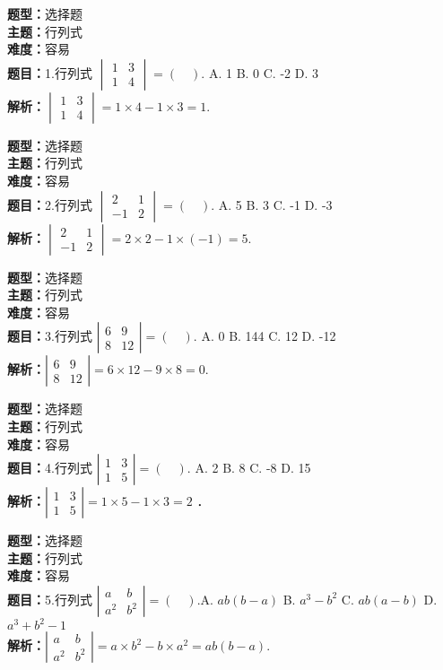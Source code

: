 \documentclass{ctexart}
\newenvironment{question}[5]{%
	\noindent\textbf{题型：}#1\\
	\textbf{主题：}#2\\
	\textbf{难度：}#3\\
	\textbf{题目：}#4\\
	\textbf{解析：}#5\\
	\vspace{1em}
}{}
\begin{document}
	\begin{question}
	{选择题}
	{行列式}
	{容易}
	{1.行列式 $\begin{vmatrix} 1 & 3 \\ 1 & 4\end{vmatrix}=(\quad).$
		A. 1 \quad B. 0 \quad C. -2 \quad D. 3}
	{$\begin{vmatrix} 1 & 3 \\ 1 & 4\end{vmatrix}=1 \times 4-1 \times 3=1. $}
\end{question}

\begin{question}
	{选择题}
	{行列式}
	{容易}
	{2.行列式 $\begin{vmatrix}2 & 1 \\ -1 & 2\end{vmatrix}=(\quad).$
		A. 5 \quad B. 3	\quad C. -1 \quad D. -3 }
	{$\begin{vmatrix}2 & 1 \\ -1 & 2\end{vmatrix}=2 \times 2-1 \times(-1)=5.$ }
\end{question}

\begin{question}
	{选择题}
	{行列式}
	{容易}
	{3.行列式 $\left|\begin{array}{cc}6 & 9 \\ 8 & 12\end{array}\right|=( \quad ). $
		A. 0 \quad B. 144 \quad C. 12 \quad D. -12}
	{$\left|\begin{array}{cc}6 & 9 \\ 8 & 12\end{array}\right|=6 \times 12-9 \times 8=0. $}
\end{question}

\begin{question}
	{选择题}
	{行列式}
	{容易}
	{4.行列式 $\left|\begin{array}{ll}1 & 3 \\ 1 & 5\end{array}\right|=( \quad ).$
		A. 2  \quad B. 8  \quad C. -8	 \quad D. 15}
	{$\left|\begin{array}{ll}1 & 3 \\ 1 & 5\end{array}\right|=1 \times 5-1 \times 3=2$ ．}
\end{question}

	\begin{question}
	{选择题}
	{行列式}
	{容易}
	{5.行列式 $\left|\begin{array}{cc}a & b \\ a^2 & b^2\end{array}\right|=(\quad). $A. $a b(b-a)$ \quad B. $a^3-b^2$ \quad C. $a b(a-b)$ \quad D. $a^3+b^2-1$}
	{$\left|\begin{array}{cc}a & b \\ a^2 & b^2\end{array}\right|=a \times b^2-b \times a^2=a b(b-a).$}
\end{question}
\end{document}
